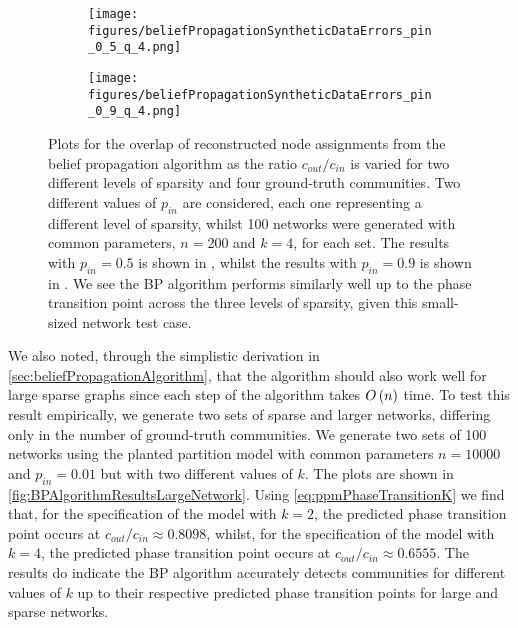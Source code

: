\begin{figure}
\centering
	\begin{subfigure}{.5\textwidth}
		\centering
		\texttt{[image: figures/beliefPropagationSyntheticDataErrors\_pin\_0\_5\_q\_4.png]}
		\caption{}
		\label{fig:BPAlgorithmResults4Communities_pin_0_5}
	\end{subfigure}%
	\begin{subfigure}{.5\textwidth}
		\centering
		\texttt{[image: figures/beliefPropagationSyntheticDataErrors\_pin\_0\_9\_q\_4.png]}
		\caption{}
		\label{fig:BPAlgorithmResults4Communities_pin_0_9}
	\end{subfigure}
	\caption[Plot of overlap for belief propagation algorithm on small-sized networks with three different levels of sparsity and four ground-truth communities.]{\label{fig:BPAlgorithmResults4Communities} Plots for the overlap of reconstructed node assignments from the belief propagation algorithm as the ratio $c_{out}/c_{in}$ is varied for two different levels of sparsity and four ground-truth communities. Two different values of $p_{in}$ are considered, each one representing a different level of sparsity, whilst 100 networks were generated with common parameters, $n = 200$ and $k = 4$, for each set. The results with $p_{in} = 0.5$ is shown in , whilst the results with $p_{in} = 0.9$ is shown in . We see the BP algorithm performs similarly well up to the phase transition point across the three levels of sparsity, given this small-sized network test case.}
\end{figure}

We also noted, through the simplistic derivation in \cref{sec:beliefPropagationAlgorithm}, that the algorithm should also work well for large sparse graphs since each step of the algorithm takes $O\left(n\right)$ time.
To test this result empirically, we generate two sets of sparse and larger networks, differing only in the number of ground-truth communities.
We generate two sets of 100 networks using the planted partition model with common parameters $n = 10000$ and $p_{in} = 0.01$ but with two different values of $k$.
The plots are shown in \cref{fig:BPAlgorithmResultsLargeNetwork}.
Using \cref{eq:ppmPhaseTransitionK} we find that, for the specification of the model with $k=2$, the predicted phase transition point occurs at $c_{out}/c_{in} \approx 0.8098$, whilst, for the specification of the model with $k=4$, the predicted phase transition point occurs at $c_{out}/c_{in} \approx 0.6555$.
The results do indicate the BP algorithm accurately detects communities for different values of $k$ up to their respective predicted phase transition points for large and sparse networks.

